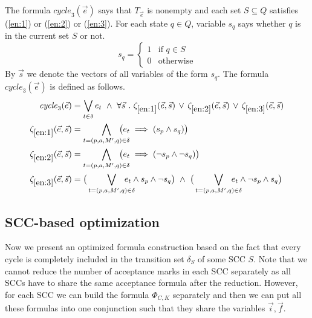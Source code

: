 \documentclass[a4paper,UKenglish,cleveref,autoref,thm-restate]{lipics-v2021}
\newcommand{\mcycle}{\mathit{cycle}}
\newcommand{\Te}{T_{\vec{e}}}
\begin{document}
The formula $\mcycle_3(\vec{e})$ says that $\Te$ is nonempty and each
set $S\subseteq Q$ satisfies (\ref{en:1}) or (\ref{en:2}) or
(\ref{en:3}).  For each state $q\in Q$, variable $s_q$ says whether
$q$ is in the current set $S$ or not.
\[s_q=\left\{
    \begin{array}{ll}
      1 & \textrm{if }q\in S\\
      0 & \textrm{otherwise}    
    \end{array}\right.
\]
By $\vec{s}$ we denote the vectors of all variables of the form $s_q$.
The formula $\mcycle_3(\vec{e})$ is defined as follows.
\begin{align*}
  \mcycle_3(\vec{e})
  &=\bigvee_{t\in\delta}e_t~\wedge~\forall\vec{s}~.~\zeta_{\ref{en:1}}(\vec{e},\vec{s})\,\vee\,
    \zeta_{\ref{en:2}}(\vec{e},\vec{s})\,\vee\,
    \zeta_{\ref{en:3}}(\vec{e},\vec{s})\\ %
  \zeta_{\ref{en:1}}(\vec{e},\vec{s}) &= \bigwedge_{t=(p,a,M',q)\in\delta}\hspace{-5mm}\big(e_t\implies (s_p\wedge s_q)\big)\\
  \zeta_{\ref{en:2}}(\vec{e},\vec{s}) &= \bigwedge_{t=(p,a,M',q)\in\delta}\hspace{-5mm}\big(e_t\implies (\neg s_p\wedge \neg s_q)\big)\\
  \zeta_{\ref{en:3}}(\vec{e},\vec{s}) &= \big(\bigvee_{t=(p,a,M',q)\in\delta}\hspace{-5mm}e_t\wedge s_p\wedge \neg s_q\big) ~\wedge~
  \big(\bigvee_{t=(p,a,M',q)\in\delta}\hspace{-5mm}e_t\wedge \neg s_p\wedge s_q\big)
\end{align*}

\subsection{SCC-based optimization}

Now we present an optimized formula construction based on the fact
that every cycle is completely included in the transition set
$\delta_S$ of some SCC $S$. Note that we cannot reduce the number of
acceptance marks in each SCC separately as all SCCs have to share the
same acceptance formula after the reduction. However, for each SCC we
can build the formula $\Phi_{C,K}$ separately and then we can put all
these formulas into one conjunction such that they share the variables
$\vec{i},\vec{f}$.
\end{document}
